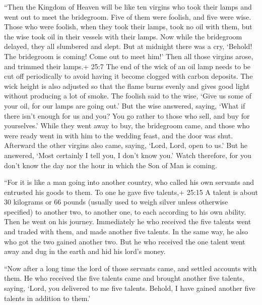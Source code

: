  ``Then the Kingdom of Heaven will be like ten virgins who
took their lamps and went out to meet the bridegroom.  Five
of them were foolish, and five were wise.  Those who were
foolish, when they took their lamps, took no oil with them, 
but the wise took oil in their vessels with their lamps. 
Now while the bridegroom delayed, they all slumbered and slept.
 But at midnight there was a cry, `Behold! The bridegroom is
coming! Come out to meet him!'  Then all those virgins
arose, and trimmed their lamps.+ 25:7 The end of the wick of an oil lamp
needs to be cut off periodically to avoid having it become clogged with
carbon deposits. The wick height is also adjusted so that the flame
burns evenly and gives good light without producing a lot of smoke.
 The foolish said to the wise, `Give us some of your oil,
for our lamps are going out.'  But the wise answered,
saying, `What if there isn't enough for us and you? You go rather to
those who sell, and buy for yourselves.'  While they went
away to buy, the bridegroom came, and those who were ready went in with
him to the wedding feast, and the door was shut.  Afterward
the other virgins also came, saying, `Lord, Lord, open to us.'
 But he answered, `Most certainly I tell you, I don't know
you.'  Watch therefore, for you don't know the day nor the
hour in which the Son of Man is coming.

 ``For it is like a man going into another country, who
called his own servants and entrusted his goods to them. 
To one he gave five talents,+ 25:15 A talent is about 30 kilograms or 66
pounds (usually used to weigh silver unless otherwise specified) to
another two, to another one, to each according to his own ability. Then
he went on his journey.  Immediately he who received the
five talents went and traded with them, and made another five talents.
 In the same way, he also who got the two gained another
two.  But he who received the one talent went away and dug
in the earth and hid his lord's money.

 ``Now after a long time the lord of those servants came,
and settled accounts with them.  He who received the five
talents came and brought another five talents, saying, `Lord, you
delivered to me five talents. Behold, I have gained another five talents
in addition to them.'

